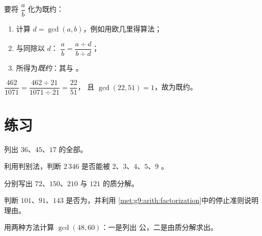 \begin{method}[彻底约分]\label{met:g9:arith:simplify}
要将 $\dfrac ab$ 化为既约：
\begin{enumerate}
  \item 计算 $d = \gcd(a, b)$，例如用欧几里得算法；
  \item {}与同除以 $d$：
        $\dfrac ab = \dfrac{a \div d}{b \div d}$；
  \item 所得为\emph{既约}：其与
        。
\end{enumerate}
\end{method}

\begin{example}
$\dfrac{462}{1071} = \dfrac{462 \div 21}{1071 \div 21} = \dfrac{22}{51}$，
且 $\gcd(22, 51) = 1$，故为既约。
\end{example}

\section{练习}

\begin{exercise}[$\star$]\label{exo:g9:arith:1}
列出 $36$、$45$、$17$ 的全部。
\end{exercise}

\begin{exercise}[$\star$]\label{exo:g9:arith:2}
利用判别法，判断 $2\,346$ 是否能被
$2$、$3$、$4$、$5$、$9$ 。
\end{exercise}

\begin{exercise}[$\star$]\label{exo:g9:arith:3}
分别写出 $72$、$150$、$210$ 与 $121$ 的质分解。
\end{exercise}

\begin{exercise}[$\star$]\label{exo:g9:arith:4}
判断 $101$、$91$、$143$ 是否为，并利用
\cref{met:g9:arith:factorization}中的停止准则说明理由。
\end{exercise}

\begin{exercise}[$\star$]\label{exo:g9:arith:5}
用两种方法计算 $\gcd(48, 60)$：一是列出
公，二是由质分解求出。
\end{exercise}

